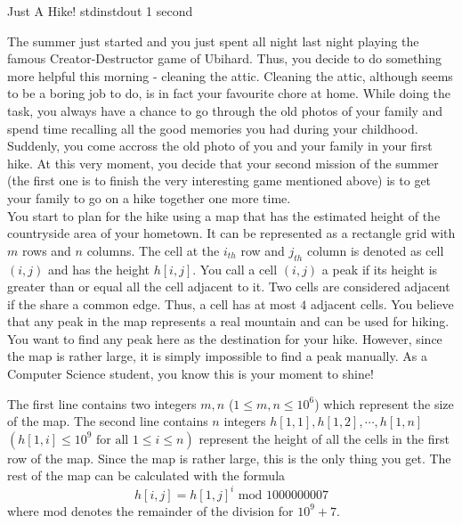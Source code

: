 
\begin{problem}{Just A Hike!}
{stdin}{stdout}
{1 second}{}{}

The summer just started and you just spent all night last night playing the famous Creator-Destructor game of Ubihard. 
Thus, you decide to do something more helpful this morning - cleaning the attic. Cleaning the attic, although seems to be
a boring job to do, is in fact your favourite chore at home. While doing the task, you always have a chance to go through 
the old photos of your family and spend time recalling all the good memories you had during your childhood. Suddenly, you 
come accross the old photo of you and your family in your first hike. At this very moment, you decide that your second
mission of the summer (the first one is to finish the very interesting game mentioned above) is to get your family to go
on a hike together one more time.\\

You start to plan for the hike using a map that has the estimated height of the countryside area of your hometown. It can be 
represented as a rectangle grid with $m$ rows and $n$ columns. The cell at the $i_{th}$ row and $j_{th}$ column is denoted 
as cell $(i, j)$ and has the height $h[i, j]$. You call a cell $(i, j)$ a peak if its height is greater than or equal all 
the cell adjacent to it. Two cells are considered adjacent if the share a common edge. Thus, a cell has at most $4$ adjacent 
cells. You believe that any peak in the map represents a real mountain and can be used for hiking. You want to find any peak 
here as the destination for your hike. However, since the map is rather large, it is simply impossible to find a peak manually.
As a Computer Science student, you know this is your moment to shine!

\InputFile

The first line contains two integers $m, n$ ($1 \leq m, n \leq 10^6$) which represent the size of the map. The second line
contains $n$ integers $h[1, 1], h[1, 2], \cdots, h[1, n]$ $(h[1, i] \leq 10^9 \text{ for all } 1 \leq i \leq n)$ represent 
the height of all the cells in the first row of the map. Since the map is rather large, this is the only thing you get. 
The rest of the map can be calculated with the formula
    \begin{equation*}
       h[i, j] = h[1, j]^i \text{ mod } 1000000007
    \end{equation*}
where mod denotes the remainder of the division for $10^9 + 7$.


\end{problem}
